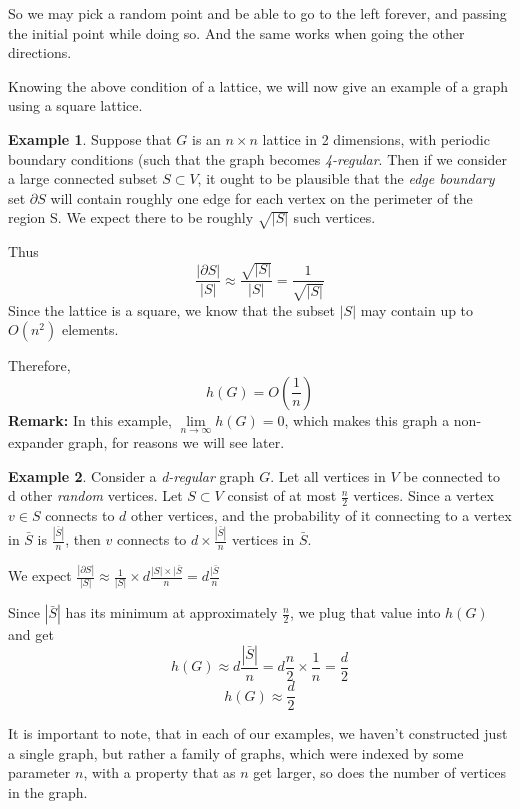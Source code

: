 \documentclass{article}
\theoremstyle{theorem}
\theoremstyle{definition}
\theoremstyle{example}
\newtheorem{example}{Example}[section]
\theoremstyle{proposition}
\begin{document}
            \newpage
            So we may pick a random point and be able to go to the left forever, and passing the initial point while doing so. And the same works when going the other directions.


            Knowing the above condition of a lattice, we will now give an example of a graph using a square lattice.
        \begin{example}
            Suppose that $G$ is an $n \times n$ lattice in 2 dimensions, with periodic boundary conditions (such that the graph becomes \textit{4-regular}. Then if we consider a large connected subset $S \subset V$, it ought to be plausible that the \textit{edge boundary} set $\partial{S}$ will contain roughly one edge for each vertex on the perimeter of the region S. We expect there to be roughly $\sqrt{|S|}$ such vertices.

            Thus
            \[\frac{|\partial{S}|}{|S|} \approx \frac{\sqrt{|S|}}{|S|} = \frac{1}{\sqrt{|S|}}\]
            Since the lattice is a square, we know that the subset $|S|$ may contain up to $O(n^{2})$ elements.

            Therefore,
            \[h(G) = O(\frac{1}{n})\]
            \textbf{Remark:} In this example, $\lim\limits_{n \rightarrow \infty} h(G) = 0$, which makes this graph a non-expander graph, for reasons we will see later.
        \end{example}
        
        \begin{example}
            Consider a \textit{d-regular} graph $G$. Let all vertices in $V$ be connected to d other \textit{random} vertices. Let $S \subset V$ consist of at most $\frac{n}{2}$ vertices. Since a vertex $v \in S$ connects to $d$ other vertices, and the probability of it connecting to a vertex in $\bar{S}$ is $\frac{|\bar{S}|}{n}$, then $v$ connects to $d \times \frac{|\bar{S}|}{n}$ vertices in $\bar{S}$.

            We expect $\frac{|\partial{S}|}{|S|} \approx \frac{1}{|S|} \times d\frac{|S| \times |\bar{S}}{n} = d\frac{|\bar{S}}{n}$

            Since $|\bar{S}|$ has its minimum at approximately $\frac{n}{2}$, we plug that value into $h(G)$ and get
            \[h(G) \approx d\frac{|\bar{S}|}{n} = d\frac{n}{2} \times \frac{1}{n} = \frac{d}{2}\]
            \[h(G) \approx \frac{d}{2}\]
        \end{example}

        It is important to note, that in each of our examples, we haven't constructed just a single graph, but rather a family of graphs, which were indexed by some parameter $n$, with a property that as $n$ get larger, so does the number of vertices in the graph.
\end{document}
